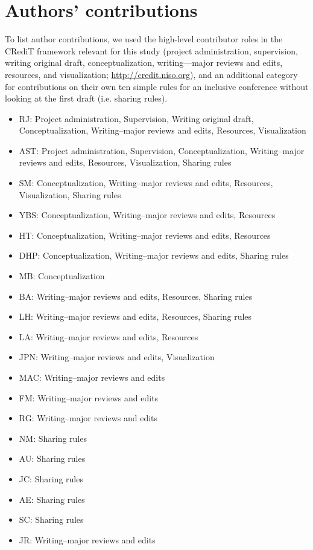 \documentclass[10pt,letterpaper]{article}
\begin{document}
\section*{Authors' contributions}

To list author contributions, we used the high-level contributor roles in the CRediT framework relevant for this study (project administration, supervision, writing original draft, conceptualization, writing—major reviews and edits, resources, and visualization; \url{http://credit.niso.org}), and an additional category for contributions on their own ten simple rules for an inclusive conference without looking at the first draft (i.e. sharing rules).

\begin{itemize}
    \item RJ: Project administration, Supervision, Writing original draft, Conceptualization, Writing--major reviews and edits, Resources, Visualization
    \item AST: Project administration, Supervision, Conceptualization,  Writing--major reviews and edits, Resources, Visualization, Sharing rules
    \item SM: Conceptualization, Writing--major reviews and edits, Resources, Visualization, Sharing rules
    \item YBS: Conceptualization, Writing--major reviews and edits, Resources
    \item HT: Conceptualization, Writing--major reviews and edits, Resources
    \item DHP: Conceptualization, Writing--major reviews and edits, Sharing rules
    \item MB: Conceptualization
    \item BA: Writing--major reviews and edits, Resources, Sharing rules
    \item LH: Writing--major reviews and edits, Resources, Sharing rules
    \item LA: Writing--major reviews and edits, Resources
    \item JPN: Writing--major reviews and edits, Visualization
    \item MAC: Writing--major reviews and edits
    \item FM: Writing--major reviews and edits
    \item RG: Writing--major reviews and edits
    \item NM: Sharing rules
    \item AU: Sharing rules
    \item JC: Sharing rules
    \item AE: Sharing rules
    \item SC: Sharing rules
    \item JR: Writing--major reviews and edits
\end{itemize}
\end{document}
